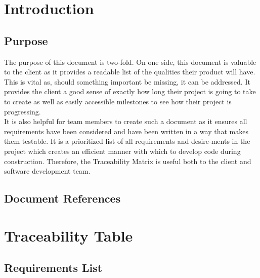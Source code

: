 \documentclass [landscape, 8pt] {article}
\newcommand {\tab} {\hspace*{2em}}
\begin{document}
\section {Introduction}
\subsection {Purpose}
\tab The purpose of this document is two-fold. On one side, this document is valuable to the client as it provides a readable list of the qualities their product will have. This is vital as, should something important be missing, it can be addressed. It provides the client a good sense of exactly how long their project is going to take to create as well as easily accessible milestones to see how their project is progressing. \\
\tab It is also helpful for team members to create such a document as it ensures all requirements have been considered and have been written in a way that makes them testable. It is a prioritized list of all requirements and desire-ments in the project which creates an efficient manner with which to develop code during construction. Therefore, the Traceability Matrix is useful both to the client and software development team. \\
	\tab \subsection {Document References}
\section {Traceability Table}
\subsection {Requirements List}
		
\end{document}
